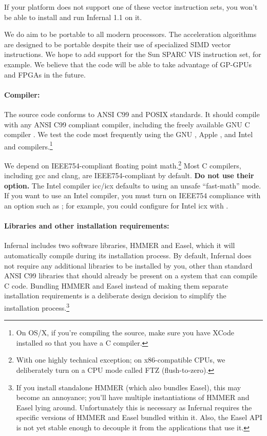 If your platform does not support one of these vector instruction
sets, you won't be able to install and run Infernal 1.1 on it.

We do aim to be portable to all modern processors. The acceleration
algorithms are designed to be portable despite their use of
specialized SIMD vector instructions. We hope to add support for the
Sun SPARC VIS instruction set, for example. We believe that the code
will be able to take advantage of GP-GPUs and FPGAs in the future.

\paragraph{Compiler:} The source code conforms to ANSI
C99 and POSIX standards. It should compile with any ANSI C99 compliant
compiler, including the freely available GNU C compiler .
We test the code most frequently using the GNU , Apple
, and Intel  and 
compilers.\footnote{On OS/X, if you're compiling the source, make sure
  you have XCode installed so that you have a C compiler.}

We depend on IEEE754-compliant floating point math.\footnote{With one
  highly technical exception; on x86-compatible CPUs, we deliberately
  turn on a CPU mode called FTZ (flush-to-zero).}  Most C compilers,
including gcc and clang, are IEEE754-compliant by default. \textbf{Do
  not use their  option.} The Intel compiler icc/icx
defaults to using an unsafe ``fast-math'' mode. If you want to use an
Intel compiler, you must turn on IEEE754 compliance with an option
such as ; for example, you could configure for
Intel icx with .

\paragraph{Libraries and other installation requirements:}
Infernal includes two software libraries, HMMER and Easel, which it
will automatically compile during its installation process.  By
default, Infernal does not require any additional libraries to be
installed by you, other than standard ANSI C99 libraries that should
already be present on a system that can compile C code. Bundling HMMER
and Easel instead of making them separate installation requirements is
a deliberate design decision to simplify the installation
process.\footnote{If you install standalone HMMER (which also bundles
  Easel), this may become an annoyance; you'll have multiple
  instantiations of HMMER and Easel lying around. Unfortunately this
  is necessary as Infernal requires the specific versions of HMMER and
  Easel bundled within it. Also, the Easel API is not yet stable
  enough to decouple it from the applications that use it.}

